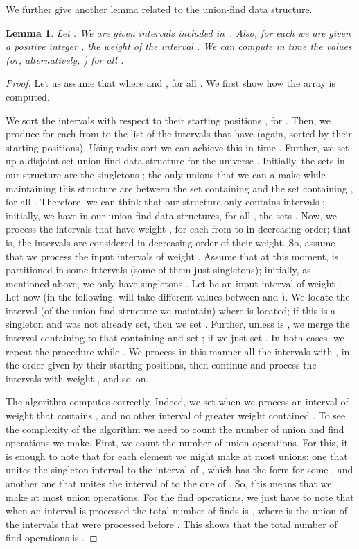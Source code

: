 \documentclass[final]{dmtcs-episciences}
\newtheorem{lemma}{Lemma}
\begin{document}
We further give another lemma related to the union-find data structure.
\begin{lemma}\label{stabbing}
Let . We are given  intervals  included in~. Also, for each  we are given a positive integer , the weight of the interval . We can compute in  time the values  (or, alternatively, ) for all .  
\end{lemma}
\begin{proof}
Let us assume that  where  and , for all . We first show how the array  is computed.  

We sort the intervals  with respect to their starting positions , for . Then, we produce for each  from  to  the list of the intervals  that have  (again, sorted by their starting positions). Using radix-sort we can achieve this in time . Further, we set up a disjoint set union-find data structure for the universe . Initially, the sets in our structure are the singletons ; the only unions that we can a make while maintaining this structure are between the set containing  and the set containing , for all . Therefore, we can think that our structure only contains intervals ; initially, we have in our union-find data structures, for all , the sets . Now, we process the intervals that have weight , for each  from  to  in decreasing order; that is, the intervals are considered in decreasing order of their weight. So, assume that we process the input intervals of weight . Assume that at this moment,  is partitioned in some intervals (some of them just singletons); initially, as mentioned above, we only have singletons . Let  be an input interval of weight . Let now  (in the following,  will take different values between  and ). We locate the interval   (of the union-find structure we maintain) where  is located; if this is a singleton and  was not already set, then we set . Further, unless  is , we merge the interval containing  to that containing  and set ; if  we just set .  In both cases, we repeat the procedure while . We process in this manner all the intervals  with , in the order given by their starting positions, then continue and process the intervals with weight , and so~on.

The algorithm computes  correctly. Indeed, we set  when we process an interval  of weight  that contains , and no other interval of greater weight contained . To see the complexity of the algorithm we need to count the number of union and find operations we make. First, we count the number of union operations. For this, it is enough to note that for each element  we might make at most  unions: one that unites the singleton interval  to the interval of , which has the form  for some , and another one that unites the interval of  to the one of . So, this means that we make at most  union operations. For the find operations, we just have to note that when an interval  is processed the total number of finds is , where  is the union of the intervals that were processed before . This shows that the total number of find operations is . 


\end{proof}
\end{document}
